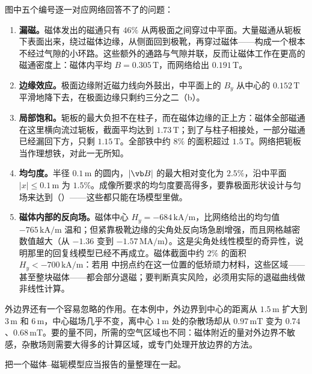 图中五个编号逐一对应网络回答不了的问题：
\begin{enumerate}
\item \textbf{漏磁。}磁体发出的磁通只有 $46\%$ 从两极面之间穿过中平面。大量磁通从轭板下表面出来，绕过磁体边缘，从侧面回到极靴，再穿过磁体——构成一个根本不经过气隙的小环路。这些额外的通路与气隙并联，反而让磁体工作在更高的磁通密度上：磁体内平均 $B=0.305\,\mathrm T$，而网络给出 $0.191\,\mathrm T$。
\item \textbf{边缘效应。}极面边缘附近磁力线向外鼓出，中平面上的 $B_y$ 从中心的 $0.152\,\mathrm T$ 平滑地降下去，在极面边缘只剩约三分之二（b）。
\item \textbf{局部饱和。}轭板的最大负担不在柱子，而在磁体边缘的正上方：磁体全部磁通在这里横向流过轭板，截面平均达到 $1.73\,\mathrm T$；到了与柱子相接处，一部分磁通已经漏回下方，只剩 $1.15\,\mathrm T$。全部铁中约 $8\%$ 的面积超过 $1.5\,\mathrm T$。网络把轭板当作理想铁，对此一无所知。
\item \textbf{均匀度。}半径 $0.1\,\mathrm m$ 的圆内，$|\vb B|$ 的最大相对变化为 $2.5\%$，沿中平面 $|x|\le0.1\,\mathrm m$ 为 $1.5\%$。成像所要求的均匀度要高得多，要靠极面形状设计与匀场来达到（）——这些都只能在场模型里做。
\item \textbf{磁体内部的反向场。}磁体中心 $H_y=-684\,\mathrm{kA/m}$，比网络给出的均匀值 $-765\,\mathrm{kA/m}$ 温和；但紧靠极靴边缘的尖角处反向场急剧增强，而且网格越密数值越大（从 $-1.36$ 变到 $-1.57\,\mathrm{MA/m}$）。这是尖角处线性模型的奇异性，说明那里的回复线模型已经不再成立。磁体截面中约 $2\%$ 的面积 $H_y<-700\,\mathrm{kA/m}$：若用 中拐点约在这一位置的低矫顽力材料，这些区域——甚至整块磁体——都会部分退磁；要判断真实风险，必须用实际的退磁曲线做非线性计算。
\end{enumerate}

外边界还有一个容易忽略的作用。在本例中，外边界到中心的距离从 $1.5\,\mathrm m$ 扩大到 $3\,\mathrm m$ 和 $6\,\mathrm m$，中心磁场几乎不变，离中心 $1\,\mathrm m$ 处的杂散场却从 $0.97\,\mathrm{mT}$ 变为 $0.74$、$0.68\,\mathrm{mT}$。要的量不同，所需的空气区域也不同：磁体附近的量对外边界不敏感，杂散场则需要大得多的计算区域，或专门处理开放边界的方法。

 把一个磁体--磁轭模型应当报告的量整理在一起。

